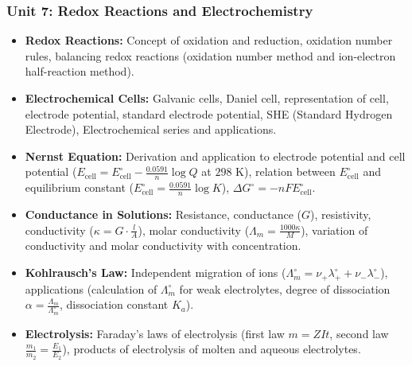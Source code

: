 \documentclass[11pt,a4paper]{article}
\begin{document}
\subsubsection{Unit 7: Redox Reactions and Electrochemistry}
\begin{itemize}
  \item \textbf{Redox Reactions:} Concept of oxidation and reduction, oxidation number rules, balancing redox reactions (oxidation number method and ion-electron half-reaction method).
  \item \textbf{Electrochemical Cells:} Galvanic cells, Daniel cell, representation of cell, electrode potential, standard electrode potential, SHE (Standard Hydrogen Electrode), Electrochemical series and applications.
  \item \textbf{Nernst Equation:} Derivation and application to electrode potential and cell potential ($E_{\text{cell}} = E^\circ_{\text{cell}} - \frac{0.0591}{n}\log Q$ at $298\text{ K}$), relation between $E^\circ_{\text{cell}}$ and equilibrium constant ($E^\circ_{\text{cell}} = \frac{0.0591}{n}\log K$), $\Delta G^\circ = -n F E^\circ_{\text{cell}}$.
  \item \textbf{Conductance in Solutions:} Resistance, conductance ($G$), resistivity, conductivity ($\kappa = G \cdot \frac{l}{A}$), molar conductivity ($\Lambda_m = \frac{1000\kappa}{M}$), variation of conductivity and molar conductivity with concentration.
  \item \textbf{Kohlrausch's Law:} Independent migration of ions ($\Lambda_m^\circ = \nu_+ \lambda_+^\circ + \nu_- \lambda_-^\circ$), applications (calculation of $\Lambda_m^\circ$ for weak electrolytes, degree of dissociation $\alpha = \frac{\Lambda_m}{\Lambda_m^\circ}$, dissociation constant $K_a$).
  \item \textbf{Electrolysis:} Faraday's laws of electrolysis (first law $m = ZIt$, second law $\frac{m_1}{m_2} = \frac{E_1}{E_2}$), products of electrolysis of molten and aqueous electrolytes.
\end{itemize}
\end{document}
